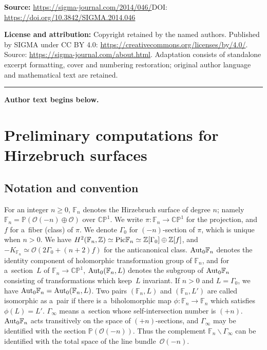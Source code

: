 \documentclass[11pt]{article}
\numberwithin{equation}{section}
\begin{document}
\noindent\textbf{Source:} \url{https://sigma-journal.com/2014/046/}\quad DOI: \url{https://doi.org/10.3842/SIGMA.2014.046}\par
\noindent\textbf{License and attribution:} Copyright retained by the named authors. Published by SIGMA under CC BY 4.0: \url{https://creativecommons.org/licenses/by/4.0/}. Source: \url{https://sigma-journal.com/about.html}. Adaptation consists of standalone excerpt formatting, cover and numbering restoration; original author language and mathematical text are retained.\par
\medskip\hrule\medskip\noindent\textbf{Author text begins below.}\par
\setcounter{section}{1}
\setcounter{subsection}{0}
\setcounter{subsubsection}{0}
\setcounter{Theorem}{4}
\setcounter{equation}{1}
\section{Preliminary computations for Hirzebruch surfaces}
\label{s:Hirz}

\subsection{Notation and convention}
\label{ss:notation}

For an integer $n\ge 0$, $\mathbb{F}_n$ denotes the Hirzebruch surface of degree $n$; namely $\mathbb{F}_n=\mathbb
P(\mathscr O(-n)\oplus \mathscr O)$ over $\mathbb{CP}^1$.
We write $\pi:\mathbb{F}_n\to\mathbb{CP}^1$ for the projection, and $f$ for a~f\/iber (class) of $\pi$.
We denote $\Gamma_0$ for $(-n)$-section of $\pi$, which is unique when $n>0$.
We have $H^2(\mathbb{F}_n,\mathbb{Z})\simeq {\rm{Pic}}\mathbb{F}_n\simeq \mathbb{Z}[\Gamma_0]\oplus\mathbb{Z}[f]$, and
$-K_{\mathbb{F}_n}\simeq \mathscr O(2\Gamma_0 + (n+2)f)$ for the anticanonical class.
${\rm{Aut}}_0\mathbb{F}_n$ denotes the identity component of holomorphic transformation group of $\mathbb{F}_n$, and
for a~section~$L$ of $\mathbb{F}_n\to\mathbb{CP}^1$, ${\rm{Aut}}_0(\mathbb{F}_n,L)$ denotes the subgroup of
${\rm{Aut}}_0\mathbb{F}_n$ consisting of transformations which keep~$L$ invariant.
If $n>0$ and $L=\Gamma_0$, we have ${\rm{Aut}}_0\mathbb{F}_n= {\rm{Aut}}_0(\mathbb{F}_n,L)$.
Two pairs $(\mathbb{F}_n,L)$ and $(\mathbb{F}_n,L')$ are called isomorphic as a~pair if there is a~biholomorphic map
$\phi:\mathbb{F}_n \to \mathbb{F}_n$ which satisf\/ies $\phi(L) = L'$.
$\Gamma_{\infty}$ means a~section whose self-intersection number is $(+n)$.
${\rm{Aut}}_0\mathbb{F}_n$ acts transitively on the space of $(+n)$-sections, and $\Gamma_{\infty}$ may be
identif\/ied with the section $\mathbb P(\mathscr O(-n))$.
Thus the complement $\mathbb{F}_n\backslash \Gamma_{\infty}$ can be identif\/ied with the total space of the line bundle~$\mathscr O(-n)$.
\end{document}

